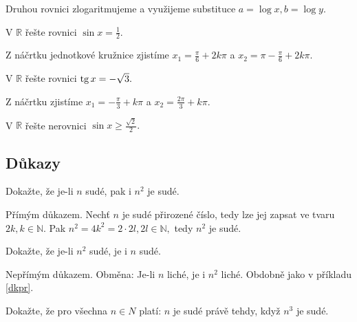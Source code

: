 \begin{reseni}
Druhou rovnici zlogaritmujeme a využijeme substituce $a=\log x, b=\log y.$
\end{reseni}

\begin{priklad}
V $\mathbb R$ řešte rovnici $\sin x = \frac{1}{2}.$
\end{priklad}

\begin{reseni}
Z náčrtku jednotkové kružnice zjistíme $x_1 = \frac{\pi}{6}+2k\pi$ a $x_2=\pi-\frac{\pi}{6}+2k\pi.$
\end{reseni}

\begin{priklad}
V $\mathbb R$ řešte rovnici $\operatorname{tg} x = -\sqrt{3}. $
\end{priklad}

\begin{reseni}
Z náčrtku zjistíme $x_1=-\frac{\pi}{3}+k\pi$ a $x_2=\frac{2\pi}{3}+k\pi.$
\end{reseni}

\begin{priklad}
V $\mathbb R$ řešte nerovnici $\sin x \geq \frac{\sqrt{2} }{2}.$
\end{priklad}


\subsection{Důkazy}
\begin{priklad}\label{dkpr}
Dokažte, že je-li $n$ sudé, pak i $n^2$ je sudé.
\end{priklad}

\begin{reseni}
Přímým důkazem. Nechť $n$ je sudé přirozené číslo, tedy lze jej zapsat ve tvaru $2k, k \in \mathbb N.$
Pak $n^2 = 4k^2 = 2\cdot 2l, 2l\in \mathbb N, $ tedy $n^2$ je sudé.
\end{reseni}

\begin{priklad}
Dokažte, že je-li $n^2$ sudé, je i $n$ sudé.
\end{priklad}

\begin{reseni}
Nepřímým důkazem. Obměna: Je-li $n$ liché, je i $n^2$ liché. Obdobně jako v příkladu \ref{dkpr}.
\end{reseni}

\begin{priklad}
Dokažte, že pro všechna $n\in N$ platí: $n$ je sudé právě tehdy, když $n^3$ je sudé.
\end{priklad}

